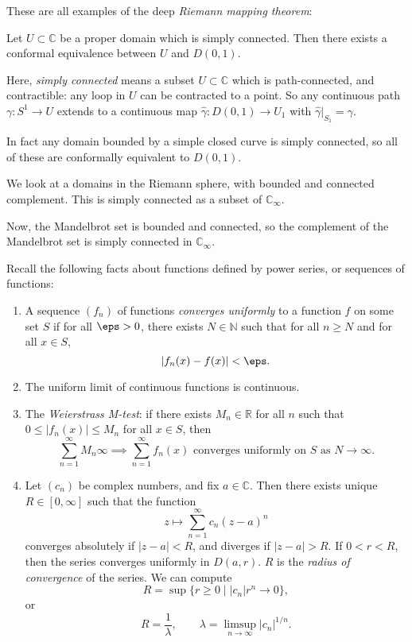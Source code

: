 \documentclass[12pt]{article}
\begin{document}
These are all examples of the deep \emph{Riemann mapping theorem}:

\begin{theorem}
	Let $U \subset \mathbb{C}$ be a proper domain which is simply connected. Then there exists a conformal equivalence between $U$ and $D(0,1)$.
\end{theorem}

Here, \emph{simply connected} means a subset $U \subset \mathbb{C}$ which is path-connected, and contractible: any loop in $U$ can be contracted to a point. So any continuous path $\gamma : S^{1} \to U$ extends to a continuous map $\hat \gamma : D(0,1) \to U_1$ with $\hat \gamma|_{S_1} = \gamma$.

In fact any domain bounded by a simple closed curve is simply connected, so all of these are conformally equivalent to $D(0,1)$.

\begin{exbox}
	We look at a domains in the Riemann sphere, with bounded and connected complement. This is simply connected as a subset of $\mathbb{C}_{\infty}$.

	Now, the Mandelbrot set is bounded and connected, so the complement of the Mandelbrot set is simply connected in $\mathbb{C}_{\infty}$.
\end{exbox}

Recall the following facts about functions defined by power series, or sequences of functions:

\begin{enumerate}[1.]
	\item A sequence $(f_n)$ of functions \emph{converges uniformly} to a function $f$ on some set $S$ if for all $\eps > 0$, there exists $N \in \mathbb{N}$ such that for all $n \geq N$ and for all $x \in S$,
		\[
		|f_n(x) - f(x)| < \eps
		.\]
	\item The uniform limit of continuous functions is continuous.
	\item The \emph{Weierstrass M-test}: if there exists $M_n \in \mathbb{R}$ for all $n$ such that $0 \leq |f_n(x)| \leq M_n$ for all $x \in S$, then
		\[
			\sum_{n = 1}^{\infty}M_n  \infty \implies \sum_{n = 1}^{\infty}f_n(x) \text{ converges uniformly on $S$ as $N \to \infty$}
		.\]
	\item Let $(c_n)$ be complex numbers, and fix $a \in \mathbb{C}$. Then there exists unique $R \in [0, \infty]$ such that the function
		\[
		z \mapsto \sum_{n = 1}^{\infty}c_n (z - a)^{n}
		\]
		converges absolutely if $|z - a| < R$, and diverges if $|z-a| > R$. If $0 < r < R$, then the series converges uniformly in $D(a, r)$. $R$ is the \emph{radius of convergence} of the series. We can compute
		\[
			R = \sup\{r \geq 0 \mid |c_n|r^{n} \to 0\}
		,\]
		or
		\[
		R = \frac{1}{\lambda}, \qquad \lambda = \limsup_{n \to \infty} |c_n|^{1/n}
		.\]
\end{enumerate}
\end{document}
